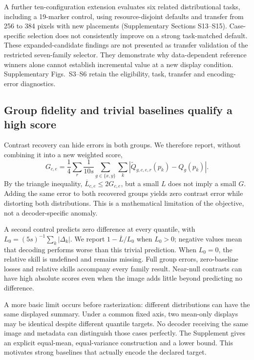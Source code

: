 \documentclass[11pt]{article}
\begin{document}
A further ten-configuration extension evaluates six related distributional tasks, including a 19-marker control, using resource-disjoint defaults and transfer from 256 to 384 pixels with new placements (Supplementary Sections S13--S15). Case-specific selection does not consistently improve on a strong task-matched default. These expanded-candidate findings are not presented as transfer validation of the restricted seven-family selector. They demonstrate why data-dependent reference winners alone cannot establish incremental value at a new display condition. Supplementary Figs.~S3--S6 retain the eligibility, task, transfer and encoding-error diagnostics.

\subsection*{Group fidelity and trivial baselines qualify a high score}
Contrast recovery can hide errors in both groups. We therefore report, without combining it into a new weighted score,
\begin{equation}
G_{c,e}=\frac{1}{4}\sum_r\frac{1}{10s}\sum_{g\in\{x,y\}}\sum_k|\widetilde Q_{g,c,e,r}(p_k)-Q_g(p_k)|.
\end{equation}
By the triangle inequality, $\overline L_{c,e}\leq2G_{c,e}$, but a small $L$ does not imply a small $G$. Adding the same error to both recovered groups yields zero contrast error while distorting both distributions. This is a mathematical limitation of the objective, not a decoder-specific anomaly.

A second control predicts zero difference at every quantile, with $L_0=(5s)^{-1}\sum_k|\Delta_k|$. We report $1-\overline L/L_0$ when $L_0>0$; negative values mean that decoding performs worse than this trivial prediction. When $L_0=0$, the relative skill is undefined and remains missing. Full group errors, zero-baseline losses and relative skills accompany every family result. Near-null contrasts can have high absolute scores even when the image adds little beyond predicting no difference.

A more basic limit occurs before rasterization: different distributions can have the same displayed summary. Under a common fixed axis, two mean-only displays may be identical despite different quantile targets. No decoder receiving the same image and metadata can distinguish those cases perfectly. The Supplement gives an explicit equal-mean, equal-variance construction and a lower bound. This motivates strong baselines that actually encode the declared target.
\end{document}
